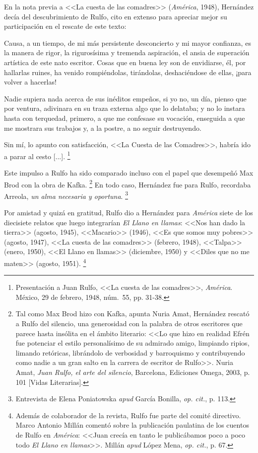 \documentclass[14pt,twoside,final]{extbook} %
\let\oldfootnote\footnote
\renewcommand\footnote[1]{%
\oldfootnote{\hspace{1mm}#1}}
\begin{document}
En la nota previa a <<La cuesta de las comadres>> (\emph{América}, 1948), Hernández
decía del descubrimiento de Rulfo, cito en extenso para apreciar mejor su
participación en el rescate de este texto:
\begin{quoting}
Causa, a un tiempo, de mi más persistente desconcierto y mi mayor confianza, es la manera de rigor, la rigurosísima y tremenda aspiración, el ansia de superación artística de este nato escritor. Cosas que en buena ley son de envidiarse, él, por hallarlas ruines, ha venido rompiéndolas, tirándolas, deshaciéndose de ellas, ¡para volver a hacerlas!

Nadie supiera nada acerca de sus inéditos empeños, si yo no, un día, pienso que por ventura, adivinara en su traza externa algo que lo delataba; y no lo instara hasta con terquedad, primero, a que me confesase su vocación, enseguida a que me mostrara sus trabajos y, a la postre, a no seguir destruyendo.

Sin mí, lo apunto con satisfacción, <<La Cuesta de las Comadres>>, habría ido a parar al cesto [...].\footnote{Presentación a Juan Rulfo, <<La cuesta de las comadres>>, \emph{América}. México, 29 de febrero, 1948, núm.~55, pp. 31-38.}
\end{quoting}
Este impulso a Rulfo ha sido comparado incluso con el papel que desempeñó Max Brod con la obra de Kafka.\footnote{Tal como Max Brod hizo con Kafka, apunta Nuria Amat\index[nombres]{Amat, Nuria}, Hernández rescató a Rulfo del silencio, una generosidad con la palabra de otros escritores que parece hasta insólita en el ámbito literario: <<Lo que hizo en realidad Efrén fue potenciar el estilo personalísimo de su admirado amigo, limpiando ripios, limando retóricas, librándolo de verbosidad y barroquismo y contribuyendo como nadie a un gran salto en la carrera de escritor de Rulfo>>. Nuria Amat, \emph{Juan Rulfo, el arte del silencio}, Barcelona, Ediciones Omega, 2003, p. 101 [Vidas Literarias].} En todo caso, Hernández fue para Rulfo, recordaba Arreola, \emph{un alma necesaria y oportuna}.\footnote{Entrevista de Elena Poniatowska\index[nombres]{Poniatowska, Elena} \emph{apud} García Bonilla\index[nombres]{Garcia@García Bonilla, Roberto}, \emph{op. cit.}, p. 113.}

Por amistad y quizá en gratitud, Rulfo dio a Hernández para \emph{América} siete de los diecisiete relatos que luego integrarían \emph{El Llano en llamas}: <<Nos han dado la tierra>> (agosto, 1945), <<Macario>> (1946), <<Es que somos muy pobres>> (agosto, 1947), <<La cuesta de las comadres>> (febrero, 1948), <<Talpa>> (enero, 1950), <<El Llano en llamas>> (diciembre, 1950) y <<Diles que no me maten>> (agosto, 1951).\footnote{Además de colaborador de la revista, Rulfo fue parte del comité directivo. Marco Antonio Millán comentó sobre la publicación paulatina de los cuentos de Rulfo en \emph{América}: <<Juan crecía en tanto le publicábamos poco a poco todo \emph{El Llano en llamas}>>. Millán \emph{apud} López Mena, \emph{op. cit.}, p. 67.}
\end{document}
